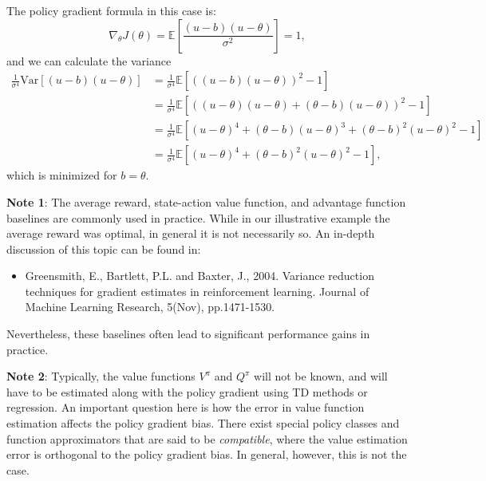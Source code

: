 The policy gradient formula in this case is:
\begin{equation*}
        \nabla_\theta J(\theta) = \mathbb{E} \left[\frac{(u-b)(u - \theta)}{\sigma^2}\right] = 1, 
\end{equation*}
and we can calculate the variance
\begin{equation*}
\begin{split}
        \frac{1}{\sigma^4}\textrm{Var}\left[(u-b)(u - \theta)\right]  
        &=\frac{1}{\sigma^4}\mathbb{E}\left[\left((u-b)(u - \theta)\right)^2 - 1\right] \\
        &=\frac{1}{\sigma^4}\mathbb{E}\left[\left((u-\theta)(u - \theta) + (\theta-b)(u - \theta)\right)^2 - 1\right] \\
        &=\frac{1}{\sigma^4}\mathbb{E}\left[(u-\theta)^4 + (\theta-b)(u - \theta)^3 + (\theta-b)^2(u - \theta)^2 - 1\right] \\
        &=\frac{1}{\sigma^4}\mathbb{E}\left[(u-\theta)^4 + (\theta-b)^2(u - \theta)^2 - 1\right],
\end{split}
\end{equation*}
which is minimized for $b=\theta$.

\textbf{Note 1}: The average reward, state-action value function, and advantage function baselines are commonly used in practice. While in our illustrative example the average reward was optimal, in general it is not necessarily so. An in-depth discussion of this topic can be found in:  
\begin{itemize}
  \item Greensmith, E., Bartlett, P.L. and Baxter, J., 2004. Variance reduction techniques for gradient estimates in reinforcement learning. Journal of Machine Learning Research, 5(Nov), pp.1471-1530.
\end{itemize}
Nevertheless, these baselines often lead to significant performance gains in practice.

\textbf{Note 2}: Typically, the value functions $V^\pi$ and $Q^\pi$ will not be known, and will have to be estimated along with the policy gradient using TD methods or regression. An important question here is how the error in value function estimation affects the policy gradient bias. There exist special policy classes and function approximators that are said to be \textit{compatible}, where the value estimation error is orthogonal to the policy gradient bias. In general, however, this is not the case. 


